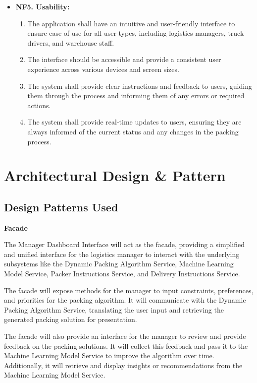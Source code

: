\documentclass{article}
\begin{document}
\begin{itemize}
\begin{enumerate}[label=4.\arabic*.]
    \end{enumerate}
    \item \textbf{NF5. Usability:}
    \begin{enumerate}[label=5.\arabic*.]
        \item The application shall have an intuitive and user-friendly interface to ensure ease of use for all user types, including logistics managers, truck drivers, and warehouse staff.
        \item The interface should be accessible and provide a consistent user experience across various devices and screen sizes.
        \item The system shall provide clear instructions and feedback to users, guiding them through the process and informing them of any errors or required actions.
        \item The system shall provide real-time updates to users, ensuring they are always informed of the current status and any changes in the packing process.
    \end{enumerate}
\end{itemize}

\section{Architectural Design \& Pattern}
\subsection{Design Patterns Used}
\textbf{Facade}

The Manager Dashboard Interface will act as the facade, providing a simplified and
unified interface for the logistics manager to interact with the underlying subsystems like
the Dynamic Packing Algorithm Service, Machine Learning Model Service, Packer
Instructions Service, and Delivery Instructions Service.

The facade will expose methods for the manager to input constraints, preferences, and
priorities for the packing algorithm. It will communicate with the Dynamic Packing
Algorithm Service, translating the user input and retrieving the generated packing
solution for presentation.

The facade will also provide an interface for the manager to review and provide
feedback on the packing solutions. It will collect this feedback and pass it to the
Machine Learning Model Service to improve the algorithm over time. Additionally, it will
retrieve and display insights or recommendations from the Machine Learning Model
Service.
\end{document}
